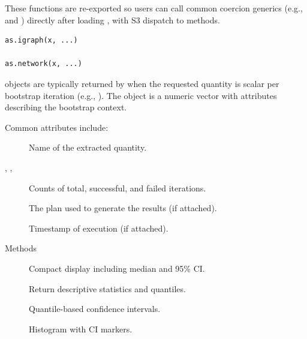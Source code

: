 \documentclass[a4paper]{book}
\begin{document}
%
\begin{Description}
These functions are re-exported so users can call common coercion generics
(e.g.,  and ) directly after loading
, with S3 dispatch to  methods.
\end{Description}
%
\begin{Usage}
\begin{verbatim}
as.igraph(x, ...)

as.network(x, ...)
\end{verbatim}
\end{Usage}
%
\begin{Description}
 objects are typically returned by 
when the requested quantity is scalar per bootstrap iteration (e.g., ).
The object is a numeric vector with attributes describing the bootstrap context.
\end{Description}
%
\begin{Details}
Common attributes include:
\begin{description}

\item[] Name of the extracted quantity.
\item[, , ] Counts of total, successful, and failed iterations.
\item[] The  plan used to generate the results (if attached).
\item[] Timestamp of execution (if attached).

\end{description}

\end{Details}
%
\begin{Section}{Methods}

\begin{description}

\item[] Compact display including median and 95\% CI.
\item[] Return descriptive statistics and quantiles.
\item[] Quantile-based confidence intervals.
\item[] Histogram with CI markers.

\end{description}

\end{Section}
\end{document}
